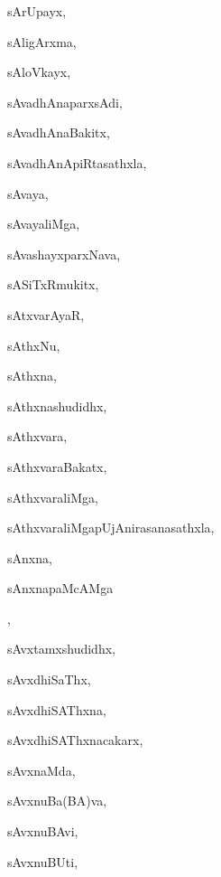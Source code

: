 \begin{multicols}{3}
{\noindent
{sArUpayx}, \pageref{sArUpayx}

\noindent
{sAligArxma}, \pageref{sAligArxma}

\noindent
{sAloVkayx}, \pageref{sAloVkayx}

\noindent
{sAvadhAnaparxsAdi}, \pageref{sAvadhAnaparxsAdi}

\noindent
{sAvadhAnaBakitx}, \pageref{sAvadhAnaBakitx}

\noindent
{sAvadhAnApiRtasathxla}, \pageref{sAvadhAnApiRtasathxla}

\noindent
{sAvaya}, \pageref{sAvaya}

\noindent
{sAvayaliMga}, \pageref{sAvayaliMga}

\noindent
{sAvashayxparxNava}, \pageref{sAvashayxparxNava}

\noindent
{sASiTxRmukitx}, \pageref{sASiTxRmukitx}

\noindent
{sAtxvarAyaR}, \pageref{sAtxvarAyaR}

\noindent
{sAthxNu}, \pageref{sAthxNu}

\noindent
{sAthxna}, \pageref{sAthxna}

\noindent
{sAthxnashudidhx}, \pageref{sAthxnashudidhx}

\noindent
{sAthxvara}, \pageref{sAthxvara}

\noindent
{sAthxvaraBakatx}, \pageref{sAthxvaraBakatx}

\noindent
{sAthxvaraliMga}, \pageref{sAthxvaraliMga}

\noindent
{sAthxvaraliMgapUjAnirasanasathxla}, \pageref{sAthxvaraliMgapUjAnirasanasathxla}

\noindent
{sAnxna}, \pageref{sAnxna}

\noindent
{sAnxnapaMcAMga}

\noindent
{}, \pageref{sAnxnapaMcAMgapaMcAMgasAnxna}

\noindent
{sAvxtamxshudidhx}, \pageref{sAvxtamxshudidhx}

\noindent
{sAvxdhiSaThx}, \pageref{sAvxdhiSaThx}

\noindent
{sAvxdhiSAThxna}, \pageref{sAvxdhiSAThxna}

\noindent
{sAvxdhiSAThxnacakarx}, \pageref{sAvxdhiSAThxnacakarx}

\noindent
{sAvxnaMda}, \pageref{sAvxnaMda}

\noindent
{sAvxnuBa(BA)va}, \pageref{sAvxnuBaBAva}

\noindent
{sAvxnuBAvi}, \pageref{sAvxnuBAvi}

\noindent
{sAvxnuBUti}, \pageref{sAvxnuBUti}

}
\end{multicols}

